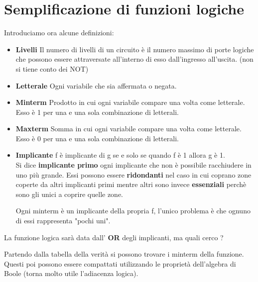 \documentclass[a4paper]{book}
\begin{document}
\chapter{Semplificazione di funzioni logiche}
Introduciamo ora alcune definizioni:\\
\begin{itemize}
\item\textbf{Livelli}
Il numero di livelli di un circuito è il numero massimo di porte logiche che possono essere attraversate all'interno di esso dall'ingresso all'uscita.
(non si tiene conto dei NOT)
\item\textbf{Letterale}
Ogni variabile che sia affermata o negata.\\
\item\textbf{Minterm}
Prodotto in cui ogni variabile compare una volta come letterale.\\ Esso è 1 per una e una sola combinazione di letterali.\\
\item\textbf{Maxterm}
Somma in cui ogni variabile compare una volta come letterale.\\ Esso è 0 per una e una sola combinazione di letterali.\\
\item\textbf{Implicante}
f è implicante di g se e solo se quando f è 1 allora g è 1.
\vspace{\baselineskip}
\\ Si dice \textbf{implicante primo} ogni implicante che non è possibile racchiudere in uno più grande.
Essi possono essere \textbf{ridondanti} nel caso in cui coprano zone coperte da altri implicanti primi mentre altri sono invece \textbf{essenziali} perchè sono gli unici a coprire quelle zone.

\vspace{\baselineskip}
\newpage
Ogni minterm è un implicante della propria f, l'unico problema è che ognuno di essi rappresenta "pochi uni".\\\break
\end{itemize}

La funzione logica sarà data dall' \textbf{OR} degli implicanti, ma quali cerco ?
\vspace{\baselineskip}

Partendo dalla tabella della verità si possono trovare i minterm della funzione.\\Questi poi possono essere compattati utilizzando le proprietà dell'algebra di Boole (torna molto utile l'adiacenza logica).
\end{document}
